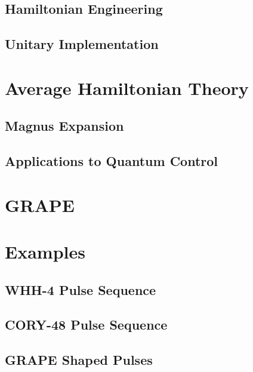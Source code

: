 \subsection{Hamiltonian Engineering}

\lipsum[1-4]

\subsection{Unitary Implementation}

\lipsum[1-3]

\section{Average Hamiltonian Theory}\label{sec:AHT}

\lipsum[1-2]

\subsection{Magnus Expansion}

\lipsum[1-2]

\subsection{Applications to Quantum Control}

\lipsum[1-5]

\section{GRAPE}

\lipsum[1-5]

\section{Examples}

\lipsum[1]

\subsection{WHH-4 Pulse Sequence}

\lipsum[1-3]

\subsection{CORY-48 Pulse Sequence}

\lipsum[1-3]

\subsection{GRAPE Shaped Pulses}

